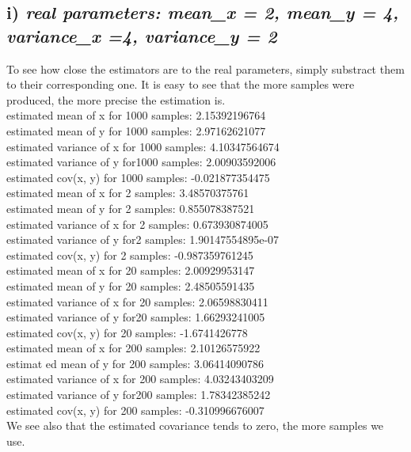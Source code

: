 \documentclass[11pt]{scrartcl} %
\begin{document}
                 \subsection*{i) {\it real parameters: mean_x = 2, mean_y = 4, variance_x =4, variance_y = 2}}
                 To see how close the estimators are to the real parameters, simply substract them to their corresponding one. It is easy to see that the more samples were produced, the more precise the estimation is.\\[5mm]
        estimated mean of x for 1000 samples: 2.15392196764\\
        estimated mean of y for 1000 samples: 2.97162621077\\
        estimated variance of x for 1000 samples: 4.10347564674\\
        estimated variance of y for1000 samples: 2.00903592006\\
        estimated cov(x, y) for 1000 samples: -0.021877354475\\[5mm]
        estimated mean of x for 2 samples: 3.48570375761\\
        estimated mean of y for 2 samples: 0.855078387521\\
        estimated variance of x for 2 samples: 0.673930874005\\
        estimated variance of y for2 samples: 1.90147554895e-07\\
        estimated cov(x, y) for 2 samples: -0.987359761245\\[5mm]
        estimated mean of x for 20 samples: 2.00929953147\\
        estimated mean of y for 20 samples: 2.48505591435\\
        estimated variance of x for 20 samples: 2.06598830411\\
        estimated variance of y for20 samples: 1.66293241005\\
        estimated cov(x, y) for 20 samples: -1.6741426778\\[5mm]
        estimated mean of x for 200 samples: 2.10126575922\\
        estimat ed mean of y for 200 samples: 3.06414090786\\
        estimated variance of x for 200 samples: 4.03243403209\\
        estimated variance of y for200 samples: 1.78342385242\\
        estimated cov(x, y) for 200 samples: -0.310996676007\\[5mm]
        We see also that the estimated covariance tends to zero, the more samples we use.
\end{document}

